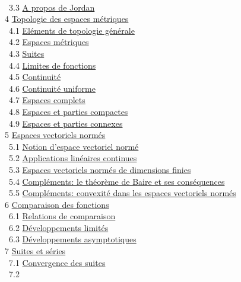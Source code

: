 \documentclass[]{article}
\begin{document}
\\ ~3.3 \href{coursse17.html\#x23-1170003.3}{A propos de Jordan} \\ 4
\href{coursch5.html\#x24-1240004}{Topologie des espaces métriques} \\
~4.1 \href{coursse18.html\#x25-1250004.1}{Eléments de topologie
générale} \\ ~4.2 \href{coursse19.html\#x26-1310004.2}{Espaces
métriques} \\ ~4.3 \href{coursse20.html\#x27-1380004.3}{Suites} \\ ~4.4
\href{coursse21.html\#x28-1420004.4}{Limites de fonctions} \\ ~4.5
\href{coursse22.html\#x29-1470004.5}{Continuité} \\ ~4.6
\href{coursse23.html\#x30-1510004.6}{Continuité uniforme} \\ ~4.7
\href{coursse24.html\#x31-1540004.7}{Espaces complets} \\ ~4.8
\href{coursse25.html\#x32-1580004.8}{Espaces et parties compactes} \\
~4.9 \href{coursse26.html\#x33-1620004.9}{Espaces et parties connexes}
\\ 5 \href{coursch6.html\#x34-1670005}{Espaces vectoriels normés} \\
~5.1 \href{coursse27.html\#x35-1680005.1}{Notion d'espace vectoriel
normé} \\ ~5.2 \href{coursse28.html\#x36-1720005.2}{Applications
linéaires continues} \\ ~5.3
\href{coursse29.html\#x37-1770005.3}{Espaces vectoriels normés de
dimensions finies} \\ ~5.4
\href{coursse30.html\#x38-1810005.4}{Compléments: le théorème de Baire
et ses conséquences} \\ ~5.5
\href{coursse31.html\#x39-1840005.5}{Compléments: convexité dans les
espaces vectoriels normés} \\ 6
\href{coursch7.html\#x40-1890006}{Comparaison des fonctions} \\ ~6.1
\href{coursse32.html\#x41-1900006.1}{Relations de comparaison} \\ ~6.2
\href{coursse33.html\#x42-1950006.2}{Développements limités} \\ ~6.3
\href{coursse34.html\#x43-1990006.3}{Développements asymptotiques} \\ 7
\href{coursch8.html\#x44-2030007}{Suites et séries} \\ ~7.1
\href{coursse35.html\#x45-2040007.1}{Convergence des suites} \\ ~7.2
\end{document}

